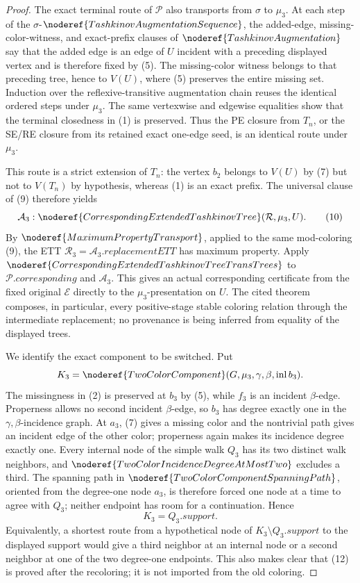 \begin{proof}
The exact terminal route of \(\mathcal P\) also transports from
\(\sigma\) to \(\mu_3\).  At each step of the
\(\sigma\)-\(\noderef{TashkinovAugmentationSequence}\), the added-edge,
missing-color-witness, and exact-prefix clauses of
\(\noderef{TashkinovAugmentation}\) say that the added edge is an edge of
\(U\) incident with a preceding displayed vertex and is therefore fixed
by (5).  The missing-color witness belongs to that preceding tree, hence
to \(V(U)\), where (5) preserves the entire missing set.  Induction over
the reflexive-transitive augmentation chain reuses
the identical ordered steps under \(\mu_3\).  The same vertexwise and
edgewise equalities show that the terminal closedness in (1) is preserved.
Thus the PE closure from \(T_n\), or the SE/RE closure from its retained
exact one-edge seed, is an identical route under \(\mu_3\).

This route is a strict extension of \(T_n\): the vertex \(b_2\) belongs
to \(V(U)\) by (7) but not to \(V(T_n)\) by hypothesis, whereas (1) is
an exact prefix.  The universal clause of (9) therefore yields
\[
 \mathcal A_3:
 \noderef{CorrespondingExtendedTashkinovTree}
       (\mathcal R,\mu_3,U).                                  \tag{10}
\]
By \(\noderef{MaximumPropertyTransport}\), applied to the same
mod-coloring (9), the ETT
\(\mathcal R_3=\mathcal A_3.\mathit{replacementETT}\) has maximum
property.  Apply
\(\noderef{CorrespondingExtendedTashkinovTreeTransTrees}\) to
\(\mathcal P.\mathit{corresponding}\) and \(\mathcal A_3\).  This
gives an actual corresponding certificate from the fixed original
\(\mathcal E\) directly to the \(\mu_3\)-presentation on \(U\).  The
cited theorem composes, in particular, every positive-stage stable
coloring relation through the intermediate replacement; no provenance is
being inferred from equality of the displayed trees.                         \(\tag{11}\)

We identify the exact component to be switched.  Put
\[
 K_3=\noderef{TwoColorComponent}(G,\mu_3,\gamma,\beta,
                                      \operatorname{inl}b_3).
\]
The missingness in (2) is preserved at \(b_3\) by (5), while \(f_3\)
is an incident \(\beta\)-edge.  Properness allows no second incident
\(\beta\)-edge, so \(b_3\) has degree exactly one in the
\(\gamma,\beta\)-incidence graph.  At \(a_3\), (7) gives a missing
color and the nontrivial path gives an incident edge of the other color;
properness again makes its incidence degree exactly one.  Every internal
node of the simple walk \(Q_3\) has its two distinct walk neighbors, and
\(\noderef{TwoColorIncidenceDegreeAtMostTwo}\) excludes a third.
The spanning path in
\(\noderef{TwoColorComponentSpanningPath}\), oriented from the
degree-one node \(a_3\), is therefore forced one node at a time to agree
with \(Q_3\); neither endpoint has room for a continuation.  Hence
\[
                              K_3=Q_3.\mathit{support}.        \tag{12}
\]
Equivalently, a shortest route from a hypothetical node of
\(K_3\setminus Q_3.\mathit{support}\) to the displayed support would
give a third neighbor at an internal node or a second neighbor at one of
the two degree-one endpoints.  This also makes clear that (12) is proved
after the recoloring; it is not imported from the old coloring.


\end{proof}
